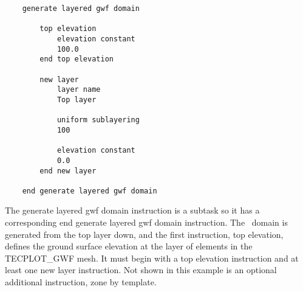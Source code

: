 \begin{verbatim}
    generate layered gwf domain

        top elevation
            elevation constant
            100.0
        end top elevation

        new layer
            layer name
            Top layer

            uniform sublayering
            100

            elevation constant
            0.0
        end new layer

    end generate layered gwf domain
\end{verbatim}
The \textsf{generate layered gwf domain} instruction is a subtask so it has a corresponding \textsf{end generate layered gwf domain} instruction.  The \gwf\ domain is generated from the top layer down, and the first instruction, \textsf{top elevation}, defines the ground surface elevation at the layer of elements in the TECPLOT\_GWF mesh. It must begin with a \textsf{top elevation} instruction and at least one \textsf{new layer} instruction. Not shown in this example is an optional additional instruction, \textsf{zone by template}.
